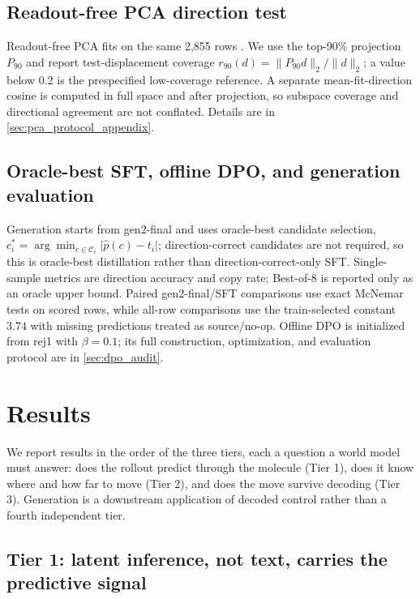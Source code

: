 \documentclass[11pt]{article}
\begin{document}
\subsection{Readout-free PCA direction test}
\label{sec:pca_methods}

Readout-free PCA fits on the same 2{,}855 rows \citep{Jolliffe2016PCA}. We use the top-90\% projection $P_{90}$ and report test-displacement coverage $r_{90}(d)=\lVert P_{90}d\rVert_2/\lVert d\rVert_2$; a value below $0.2$ is the prespecified low-coverage reference. A separate mean-fit-direction cosine is computed in full space and after projection, so subspace coverage and directional agreement are not conflated. Details are in \cref{sec:pca_protocol_appendix}.

\subsection{Oracle-best SFT, offline DPO, and generation evaluation}
\label{sec:generation_methods}

Generation starts from gen2-final and uses oracle-best candidate selection, $c_i^*=\arg\min_{c\in\mathcal C_i}\lvert\hat p(c)-t_i\rvert$; direction-correct candidates are not required, so this is oracle-best distillation rather than direction-correct-only SFT. Single-sample metrics are direction accuracy and copy rate; Best-of-8 is reported only as an oracle upper bound. Paired gen2-final/SFT comparisons use exact McNemar tests on scored rows, while all-row comparisons use the train-selected constant $3.74$ with missing predictions treated as source/no-op. Offline DPO is initialized from rej1 with $\beta=0.1$; its full construction, optimization, and evaluation protocol are in \cref{sec:dpo_audit}.

\section{Results}
\label{sec:results}

We report results in the order of the three tiers, each a question a world model must answer: does the rollout predict through the molecule (Tier 1), does it know where and how far to move (Tier 2), and does the move survive decoding (Tier 3). Generation is a downstream application of decoded control rather than a fourth independent tier.

\subsection{Tier 1: latent inference, not text, carries the predictive signal}
\end{document}
